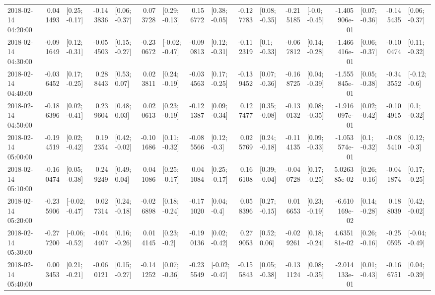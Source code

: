 \begin{tabular}{lrlrlrlrlrlrlrlrl}
2018-02-14 04:20:00 &  0.041493 &   [0.25; -0.17] & -0.143836 &   [0.06; -0.37] &  0.073728 &   [0.29; -0.13] &  0.156772 &   [0.38; -0.05] & -0.127783 &   [0.08; -0.35] & -0.215185 &   [-0.0; -0.45] & -1.405906e-01 &   [0.07; -0.36] & -0.145435 &   [0.06; -0.37] \\
2018-02-14 04:30:00 & -0.091649 &   [0.12; -0.31] & -0.054503 &   [0.15; -0.27] & -0.230672 &  [-0.02; -0.47] & -0.090813 &   [0.12; -0.31] & -0.112319 &    [0.1; -0.33] & -0.067812 &   [0.14; -0.28] & -1.466416e-01 &   [0.06; -0.37] & -0.100474 &   [0.11; -0.32] \\
2018-02-14 04:40:00 & -0.036452 &   [0.17; -0.25] &  0.288443 &    [0.53; 0.07] &  0.023811 &   [0.24; -0.19] & -0.034563 &   [0.17; -0.25] & -0.139452 &   [0.07; -0.36] & -0.168725 &   [0.04; -0.39] & -1.555845e-01 &   [0.05; -0.38] & -0.343552 &   [-0.12; -0.6] \\
2018-02-14 04:50:00 & -0.186396 &   [0.02; -0.41] &  0.239604 &    [0.48; 0.03] &  0.020613 &   [0.23; -0.19] & -0.121387 &   [0.09; -0.34] &  0.127477 &   [0.35; -0.08] & -0.130132 &   [0.08; -0.35] & -1.916097e-01 &   [0.02; -0.42] & -0.104915 &    [0.1; -0.32] \\
2018-02-14 05:00:00 & -0.194519 &   [0.02; -0.42] &  0.192354 &   [0.42; -0.02] & -0.101686 &   [0.11; -0.32] & -0.085566 &    [0.12; -0.3] &  0.025769 &   [0.24; -0.18] & -0.114135 &   [0.09; -0.33] & -1.053574e-01 &    [0.1; -0.32] & -0.085410 &    [0.12; -0.3] \\
2018-02-14 05:10:00 & -0.160474 &   [0.05; -0.38] &  0.249249 &    [0.49; 0.04] &  0.041086 &   [0.25; -0.17] &  0.041084 &   [0.25; -0.17] &  0.166108 &   [0.39; -0.04] & -0.040728 &   [0.17; -0.25] &  5.026385e-02 &   [0.26; -0.16] & -0.041874 &   [0.17; -0.25] \\
2018-02-14 05:20:00 & -0.235906 &  [-0.02; -0.47] &  0.027314 &   [0.24; -0.18] & -0.026898 &   [0.18; -0.24] & -0.171020 &    [0.04; -0.4] &  0.058396 &   [0.27; -0.15] &  0.016653 &   [0.23; -0.19] & -6.610169e-02 &   [0.14; -0.28] &  0.188039 &   [0.42; -0.02] \\
2018-02-14 05:30:00 & -0.277200 &  [-0.06; -0.52] & -0.044407 &   [0.16; -0.26] &  0.014145 &    [0.23; -0.2] & -0.190136 &   [0.02; -0.42] &  0.279053 &    [0.52; 0.06] & -0.029261 &   [0.18; -0.24] &  4.635181e-02 &   [0.26; -0.16] & -0.250595 &  [-0.04; -0.49] \\
2018-02-14 05:40:00 &  0.003453 &   [0.21; -0.21] & -0.060121 &   [0.15; -0.27] & -0.141252 &   [0.07; -0.36] & -0.235549 &  [-0.02; -0.47] & -0.155843 &   [0.05; -0.38] & -0.131124 &   [0.08; -0.35] & -2.014133e-01 &   [0.01; -0.43] & -0.166751 &   [0.04; -0.39] \\

\end{tabular}
